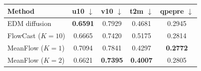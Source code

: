 \documentclass[border=10pt]{standalone}
\begin{document}
\begin{tabular}{lcccc}
\toprule
Method & u10 $\downarrow$ & v10 $\downarrow$ & t2m $\downarrow$ & qpepre $\downarrow$ \\
\midrule
EDM diffusion & \textbf{0.6591} & 0.7929 & 0.4681 & 0.2945 \\
FlowCast ($K{=}10$) & 0.6665 & 0.7420 & 0.5175 & 0.2814 \\
MeanFlow ($K{=}1$) & 0.7094 & 0.7841 & 0.4297 & \textbf{0.2772} \\
MeanFlow ($K{=}2$) & 0.6621 & \textbf{0.7395} & \textbf{0.4007} & 0.2805 \\
\bottomrule
\end{tabular}
\end{document}
